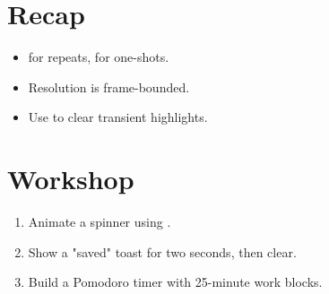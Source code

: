 \section{Recap}

\begin{recap}
\begin{itemize}[leftmargin=*]
  \item {} for repeats,  for one-shots.
  \item Resolution is frame-bounded.
  \item Use  to clear transient highlights.
\end{itemize}
\end{recap}

\section*{Workshop}

\begin{enumerate}[leftmargin=*]
  \item Animate a spinner using .
  \item Show a "saved" toast for two seconds, then clear.
  \item Build a Pomodoro timer with 25-minute work blocks.
\end{enumerate}
